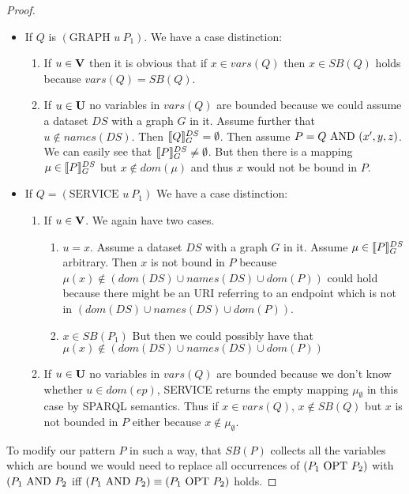 \begin{proof}
\begin{itemize}
		\item If $Q$ is $(\mbox{GRAPH } u \ P_1)$. We have a case distinction:
			\begin{enumerate}
				\item If $u \in \mathbf{V}$ then it is obvious that if $x \in vars(Q)$ then 
					$x \in SB(Q)$ holds because $vars(Q) = SB(Q)$.
				\item If $u \in \mathbf{U}$ no variables in $vars(Q)$ are bounded because we could
					assume a dataset $DS$ with a graph $G$ in it. Assume
					further that $u \notin names(DS)$. Then $\llbracket Q \rrbracket^{DS}_{G}
					= \emptyset$. Then assume $P = Q \mbox{ AND } (x',y,z)$. 
					We can easily see that $\llbracket P \rrbracket^{DS}_{G} \neq \emptyset$.
					But then there is a mapping $\mu \in \llbracket P \rrbracket^{DS}_{G}$
					but $x \notin dom(\mu)$ and thus $x$ would not be bound in $P$.
			\end{enumerate}

		\item If $Q = (\mbox{SERVICE }  u \ P_1)$ We have a case distinction:
			\begin{enumerate}
				\item If $u \in \mathbf{V}$. We again have two cases. 
					\begin{enumerate}
						\item $u = x$. 
							Assume a dataset $DS$ with a graph $G$ in it.	
							Assume $\mu \in \llbracket P\rrbracket^{DS}_G$ arbitrary.
							Then $x$ is not bound in $P$ because $\mu(x) \notin (dom(DS) \cup
							names(DS) \cup dom(P))$ could hold because there
							might be an URI referring to an endpoint which is
							not in $(dom(DS) \cup
							names(DS) \cup dom(P))$.
						\item $x \in SB(P_1)$ But then we could possibly have that
							$\mu(x) \notin (dom(DS) \cup names(DS) \cup dom(P))$
					\end{enumerate}

				\item If $u \in \mathbf{U}$ no variables in $vars(Q)$ are bounded because we
					don't know whether $u \in dom(ep)$, SERVICE returns the empty
					mapping $\mu_\emptyset$ in this case by SPARQL semantics. Thus if $x \in vars(Q)$,
					$x \notin SB(Q)$ but $x$ is not bounded in $P$ either
					because $x \notin \mu_\emptyset$.
			\end{enumerate}
	\end{itemize}

	To modify our pattern $P$ in such a way, that $SB(P)$ collects all the
	variables which are bound we would need to replace all occurrences of  $(P_1
	\mbox{ OPT } P_2)$ with $(P_1 \mbox{ AND } P_2$ iff $(P_1 \mbox{ AND }  P_2) \equiv	(P_1 \mbox{ OPT }  P_2)$
	holds.
\end{proof}

